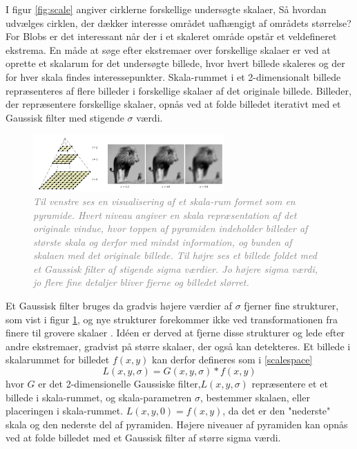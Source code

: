        \vspace{-2.5em}
\noindent
I figur \ref{fig:scale} angiver cirklerne forskellige undersøgte skalaer, Så hvordan udvælges cirklen, der dækker interesse området uafhængigt af områdets størrelse?  For Blobs er det interessant når der i et skaleret område opstår et veldefineret ekstrema. En måde at søge efter ekstremaer over forskellige skalaer er ved at oprette et skalarum for det undersøgte billede, hvor hvert billede skaleres og der for hver skala findes interessepunkter. Skala-rummet i et 2-dimensionalt billede repræsenteres af flere billeder i forskellige skalaer af det originale billede. Billeder, der repræsentere forskellige skalaer, opnås ved at folde billedet iterativt med et Gaussisk filter med stigende $\sigma$ værdi. 
\begin{figure}[H]
    \centering
    \includegraphics[width=0.65\textwidth]{fig/24.png}
    \vspace{-0.5em}   
    \begin{center}
    \caption{\textcolor{gray}{\footnotesize \textit{
Til venstre ses en visualisering af et skala-rum formet som en pyramide. Hvert niveau angiver en skala repræsentation af det originale vindue, hvor toppen af pyramiden indeholder billeder af største skala og derfor med mindst information, og bunden af skalaen med det originale billede. Til højre ses et billede foldet med et Gaussisk filter af stigende sigma værdier. Jo højere sigma værdi, jo flere fine detaljer bliver fjerne og billedet slørret.
    }}}
    \label{fig:mona}
     \end{center}
  \end{figure}
       \vspace{-2.5em}
\noindent
Et Gaussisk filter bruges da gradvis højere værdier af $\sigma$ fjerner fine strukturer, som vist i figur \ref{fig:mona}, og nye strukturer forekommer ikke ved transformationen fra finere til grovere skalaer \cite{lindenscale}. Idéen er derved at fjerne disse strukturer og lede efter  andre ekstremaer, gradvist på større skalaer, der også kan detekteres.
Et billede i skalarummet for billedet $f(x,y)$ kan derfor defineres som i \eqref{scalespace}
\begin{equation}
L(x,y,\sigma) = G(x,y,\sigma)\ast f(x,y)
\label{scalespace}
\end{equation}
hvor $G$ er det 2-dimensionelle Gaussiske filter,$L(x,y,\sigma)$ repræsentere et et billede i skala-rummet, og skala-parametren $\sigma$, bestemmer skalaen, eller placeringen i skala-rummet. $L(x,y,0) = f(x,y)$, da det er den "nederste" skala og den nederste del af pyramiden. Højere niveauer af pyramiden kan opnås ved at folde billedet med et Gaussisk filter af større sigma værdi.